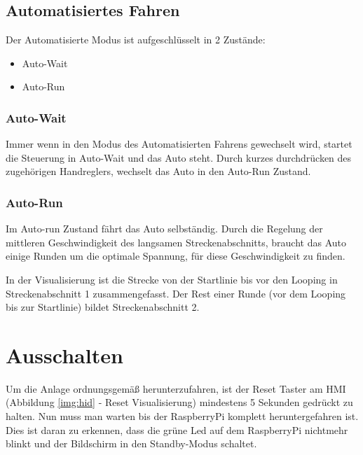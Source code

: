 \documentclass[a4paper, 11pt]{report}
\begin{document}
	\subsection{Automatisiertes Fahren}
		Der Automatisierte Modus ist aufgeschlüsselt in 2 Zustände:
		\begin{itemize}
			\item Auto-Wait
			\item Auto-Run
		\end{itemize}
		\subsubsection{Auto-Wait}
		Immer wenn in den Modus des Automatisierten Fahrens gewechselt wird, startet die Steuerung in
		Auto-Wait und das Auto steht.
		Durch kurzes durchdrücken des zugehörigen Handreglers, wechselt das Auto in den Auto-Run Zustand.
		\subsubsection{Auto-Run}
			Im Auto-run Zustand fährt das Auto selbständig. Durch die Regelung der mittleren Geschwindigkeit des langsamen Streckenabschnitts, braucht das Auto einige Runden um die optimale Spannung, für diese Geschwindigkeit zu finden.

			In der Visualisierung ist die Strecke von der Startlinie bis vor den Looping in Streckenabschnitt 1 zusammengefasst.
			Der Rest einer Runde (vor dem Looping bis zur Startlinie) bildet Streckenabschnitt 2.
\section{Ausschalten}
Um die Anlage ordnungsgemäß herunterzufahren, ist der Reset Taster am HMI (Abbildung \ref{img:hid} - Reset Visualisierung) mindestens 5 Sekunden gedrückt zu halten.
Nun muss man warten bis der RaspberryPi komplett heruntergefahren ist. Dies ist daran zu erkennen, dass die grüne Led auf dem RaspberryPi nichtmehr blinkt und der Bildschirm in den Standby-Modus schaltet.
\end{document}
